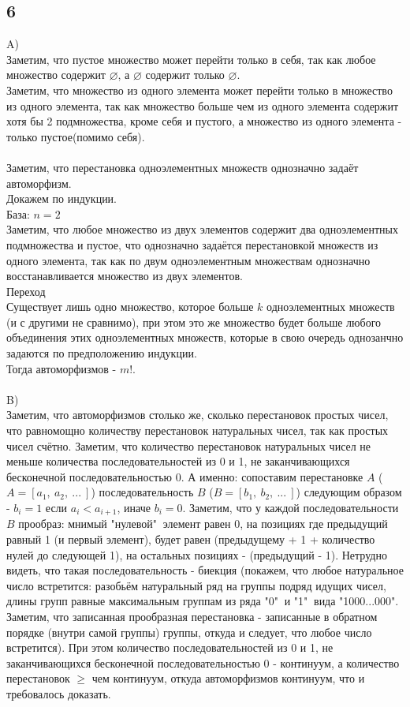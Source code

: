 		\subsection{6}
		A)\\
		Заметим, что пустое множество может перейти только в себя, так как любое множество содержит $\varnothing$, а $\varnothing$ содержит только $\varnothing$.\\
		Заметим, что множество из одного элемента может перейти только в множество из одного элемента, так как множество больше чем из одного элемента содержит хотя бы 2 подмножества, кроме себя и пустого, а множество из одного элемента - только пустое(помимо себя).\\ \\
		Заметим, что перестановка одноэлементных множеств однозначно задаёт автоморфизм. \\
		Докажем по индукции.\\
		База: $n = 2$\\ 
		Заметим, что любое множество из двух элементов содержит два одноэлементных подмножества и пустое, что однозначно задаётся перестановкой множеств из одного элемента, так как по двум одноэлементным множествам однозначно восстанавливается множество из двух элементов.\\
		Переход\\
		Существует лишь одно множество, которое больше $k$ одноэлементных множеств (и с другими не сравнимо), при этом это же множество будет больше любого объединения этих одноэлементных множеств, которые в свою очередь однозанчно задаются по предположению индукции.\\
		Тогда автоморфизмов - $m!$.
		\\ \\
		B)\\
		Заметим, что автоморфизмов столько же, сколько перестановок простых чисел, что равномощно количеству перестановок натуральных чисел, так как простых чисел счётно. Заметим, что количество перестановок натуральных чисел не меньше количества последовательностей из 0 и 1, не заканчивающихся бесконечной последовательностью 0. А именно: сопоставим перестановке $A$  ($A = [a_1,\: a_2,\: ... \:]$) последовательность $B$ ($B = [b_1,\: b_2,\: ... \:]$) следующим образом - $b_i = 1$ если $a_i < a_{i+1}$, иначе $b_i = 0$. Заметим, что у каждой последовательности $B$ прообраз: мнимый "нулевой" $\ $элемент равен 0, на позициях где предыдущий равный 1 (и первый элемент), будет равен (предыдущему + 1 + количество нулей до следующей 1), на остальных позициях - (предыдущий - 1). Нетрудно видеть, что такая последовательность - биекция (покажем, что любое натуральное число встретится: разобьём натуральный ряд на группы подряд идущих чисел, длины групп равные максимальным группам из ряда "0" $\ $и "1" $\ $вида "1000...000". Заметим, что записанная прообразная перестановка - записанные в обратном порядке (внутри самой группы) группы, откуда и следует, что любое число встретится). При этом количество последовательностей из 0 и 1, не заканчивающихся бесконечной последовательностью 0 - континуум, а количество перестановок $\geqslant$ чем континуум, откуда автоморфизмов континуум, что и требовалось доказать.
		\\ \\
